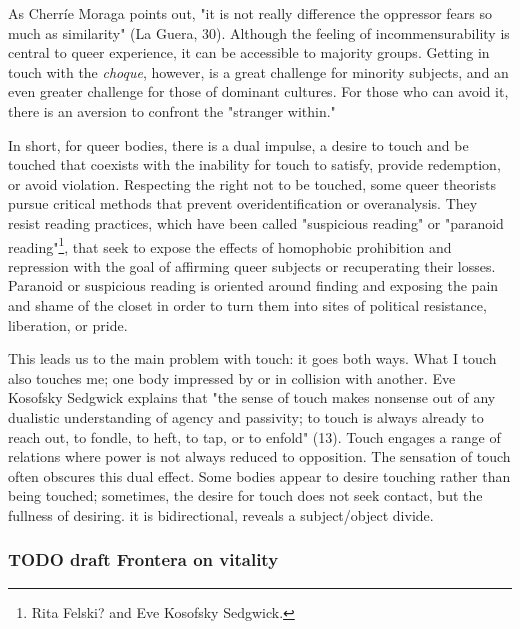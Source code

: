 \documentclass[11pt]{article}
\begin{document}
As Cherríe Moraga points out, "it is not really difference the
oppressor fears so much as similarity" (La Guera, 30). Although the
feeling of incommensurability is central to queer experience, it can
be accessible to majority groups. Getting in touch with the \emph{choque},
however, is a great challenge for minority subjects, and an even
greater challenge for those of dominant cultures. For those who can
avoid it, there is an aversion to confront the "stranger within."

In short, for queer bodies, there is a dual impulse, a desire to touch
and be touched that coexists with the inability for touch to satisfy,
provide redemption, or avoid violation. Respecting the right not to be
touched, some queer theorists pursue critical methods that prevent
overidentification or overanalysis. They resist reading practices,
which have been called "suspicious reading" or "paranoid
reading"\footnote{Rita Felski? and Eve Kosofsky Sedgwick.\label{org40c1da5}}, that seek to expose the effects of homophobic
prohibition and repression with the goal of affirming queer subjects
or recuperating their losses. Paranoid or suspicious reading is
oriented around finding and exposing the pain and shame of the closet
in order to turn them into sites of political resistance, liberation,
or pride.

This leads us to the main problem with touch: it goes both ways. What
I touch also touches me; one body impressed by or in collision with
another. Eve Kosofsky Sedgwick explains that "the sense of touch makes
nonsense out of any dualistic understanding of agency and passivity;
to touch is always already to reach out, to fondle, to heft, to tap,
or to enfold" (13). Touch engages a range of relations where power is
not always reduced to opposition. The sensation of touch often
obscures this dual effect. Some bodies appear to desire touching
rather than being touched; sometimes, the desire for touch does not
seek contact, but the fullness of desiring.  it is bidirectional,
reveals a subject/object divide.

\subsubsection{{\bfseries\sffamily TODO} draft Frontera on vitality}
\label{sec:orge5d2414}
\end{document}
